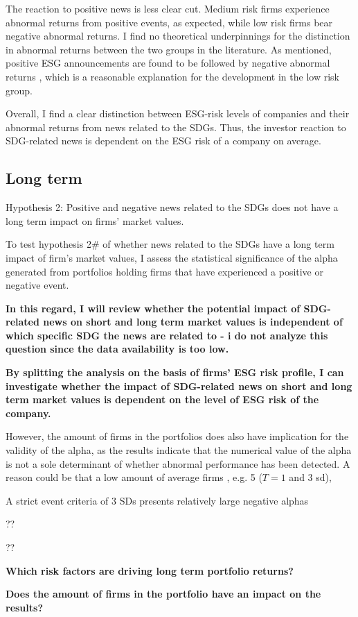 The reaction to positive news is less clear cut. Medium risk firms experience abnormal returns from positive events, as expected, while low risk firms bear negative abnormal returns. I find no theoretical underpinnings for the distinction in abnormal returns between the two groups in the literature. As mentioned, positive ESG announcements are found to be followed by negative abnormal returns \cite{fisher2011voluntary}, which is a reasonable explanation for the development in the low risk group. 

Overall, I find a clear distinction between ESG-risk levels of companies and their abnormal returns from news related to the SDGs. Thus, the investor reaction to SDG-related news is dependent on the ESG risk of a company on average. 


\subsection{Long term}

Hypothesis 2: Positive and negative news related to the SDGs does not have a long term impact on firms’ market values.

To test hypothesis 2# of whether news related to the SDGs have a long term impact of firm's market values, I assess the statistical significance of the alpha generated from portfolios holding firms that have experienced a positive or negative event. 




\textbf{In this regard, I will review
whether the potential impact of SDG-related news on short and long term market values
is independent of which specific SDG the news are related to - i do not analyze this question since the data availability is too low.}



\textbf{By splitting the analysis on the basis of firms’
ESG risk profile, I can investigate whether the impact of SDG-related news on short and
long term market values is dependent on the level of ESG risk of the company.}

  However, the amount of firms in the portfolios does also have implication for the validity of the alpha, as the results indicate that the numerical value of the alpha is not a sole determinant of whether abnormal performance has been detected. A reason could be that a low amount of average firms , e.g. 5 ($T = 1$ and 3 sd), 

A strict event criteria of 3 SDs presents relatively large negative alphas

  ??

??






\textbf{Which risk factors are driving long term portfolio returns?}


\textbf{Does the amount of firms in the portfolio have an impact on the results?}

